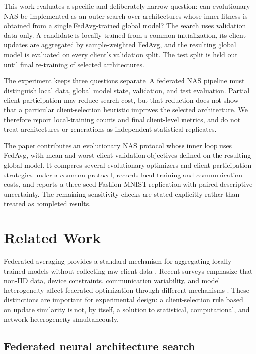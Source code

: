 \documentclass[11pt]{article}
\begin{document}
This work evaluates a specific and deliberately narrow question: can evolutionary NAS be implemented as an outer search over architectures whose inner fitness is obtained from a single FedAvg-trained global model? The search uses validation data only. A candidate is locally trained from a common initialization, its client updates are aggregated by sample-weighted FedAvg, and the resulting global model is evaluated on every client's validation split. The test split is held out until final re-training of selected architectures.

The experiment keeps three questions separate. A federated NAS pipeline must distinguish local data, global model state, validation, and test evaluation. Partial client participation may reduce search cost, but that reduction does not show that a particular client-selection heuristic improves the selected architecture. We therefore report local-training counts and final client-level metrics, and do not treat architectures or generations as independent statistical replicates.

The paper contributes an evolutionary NAS protocol whose inner loop uses FedAvg, with mean and worst-client validation objectives defined on the resulting global model. It compares several evolutionary optimizers and client-participation strategies under a common protocol, records local-training and communication costs, and reports a three-seed Fashion-MNIST replication with paired descriptive uncertainty. The remaining sensitivity checks are stated explicitly rather than treated as completed results.

\section{Related Work}

Federated averaging provides a standard mechanism for aggregating locally trained models without collecting raw client data \cite{mcmahan2017}. Recent surveys emphasize that non-IID data, device constraints, communication variability, and model heterogeneity affect federated optimization through different mechanisms \cite{kairouz2021,lu2024noniid,ye2024hfl}. These distinctions are important for experimental design: a client-selection rule based on update similarity is not, by itself, a solution to statistical, computational, and network heterogeneity simultaneously.

\subsection{Federated neural architecture search}
\end{document}
